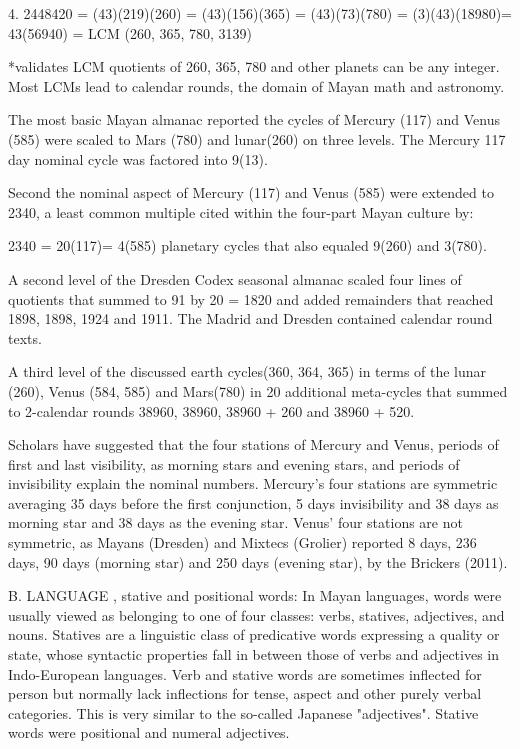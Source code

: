 \documentclass[12pt]{article}
\begin{document}
4. 2448420 = (43)(219)(260) = (43)(156)(365) = (43)(73)(780) = (3)(43)(18980)= 43(56940) =  LCM (260, 365, 780, 3139)

*validates LCM  quotients of 260, 365, 780 and other planets can be any integer.  Most LCMs lead to calendar rounds, the domain of Mayan math and astronomy.

The most basic Mayan almanac reported the cycles of Mercury (117) and Venus (585) were scaled to Mars (780) and lunar(260) on three levels. The Mercury 117 day nominal cycle was factored into 9(13). 

Second the nominal aspect of Mercury (117) and Venus (585) were extended to 2340, a least common multiple cited within the four-part Mayan culture by:

2340 = 20(117)= 4(585) planetary cycles that also equaled 9(260) and 3(780).

A second level of the Dresden Codex seasonal almanac scaled four lines of  quotients that summed to 91 by 20 = 1820 and added remainders that reached 1898, 1898, 1924 and 1911. The Madrid and Dresden contained calendar round texts. 

A third level of the  discussed earth cycles(360, 364, 365) in terms of the lunar (260), Venus (584, 585) and Mars(780) in 20 additional meta-cycles that summed to  2-calendar rounds 38960, 38960, 38960 + 260 and 38960 + 520. 

Scholars have suggested that the four stations of Mercury and Venus, periods of first and last visibility, as morning stars and evening stars, and periods of invisibility explain the nominal numbers. Mercury's four stations are symmetric averaging 35 days before the first conjunction, 5 days invisibility and 38 days as morning star and 38 days as the evening star. Venus' four stations are not symmetric, as Mayans (Dresden) and Mixtecs (Grolier) reported 8 days, 236 days, 90 days (morning star) and 250 days (evening star), by the Brickers (2011).

B. LANGUAGE , stative and positional words: In Mayan languages, words were usually viewed as belonging to one of four classes: verbs, statives, adjectives, and nouns. Statives are a linguistic class of predicative words expressing a quality or state, whose syntactic properties fall in between those of verbs and adjectives in Indo-European languages. Verb and stative words are sometimes inflected for person but normally lack inflections for tense, aspect and other purely verbal categories. This is very similar to the so-called Japanese "adjectives". Stative words were  positional and numeral adjectives.
\end{document}
